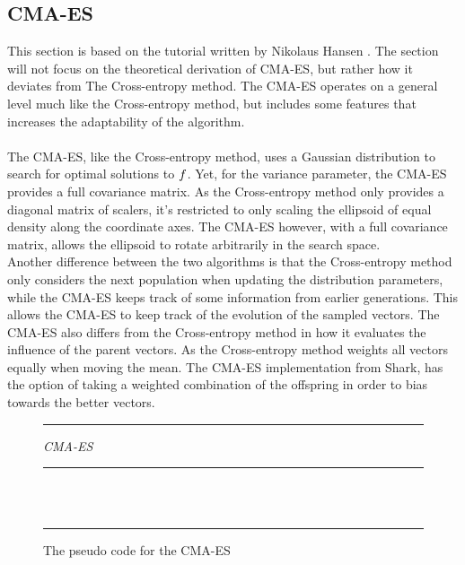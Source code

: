 \subsection{CMA-ES \label{CMAtheory}}

This section is based on the tutorial written by Nikolaus Hansen
\citep{hansen2011}. The section will not focus on the theoretical derivation
of CMA-ES, but rather how it deviates from The Cross-entropy method. 
The CMA-ES operates on a general level much like the Cross-entropy 
method, but includes some features that increases the adaptability 
of the algorithm.\\
\\
The CMA-ES, like the Cross-entropy method, uses a Gaussian distribution to
search for optimal solutions to $f$. Yet, for the 
variance parameter, the CMA-ES provides a full covariance matrix.
As the Cross-entropy method only provides a diagonal matrix of scalers,
it's restricted to only scaling the ellipsoid of equal density along
the coordinate axes. The CMA-ES however, with a full covariance matrix,
allows the ellipsoid to rotate arbitrarily in the search space.\\
Another difference between the two algorithms is that 
the Cross-entropy method only considers the next population when updating the
distribution parameters, while the CMA-ES keeps track of 
some information from earlier 
generations. This allows the CMA-ES to keep track of the evolution 
of the sampled vectors.
The CMA-ES also differs from the Cross-entropy method in how it evaluates the influence 
of the parent vectors. As the Cross-entropy method weights all vectors equally when 
moving the mean. The CMA-ES implementation from Shark, 
has the option of taking a weighted combination of the offspring in order
to bias towards the better vectors.

\begin{figure}[H]
\hrule
\vspace{0.2cm}
{\centering  \textit{CMA-ES}}
\vspace{0.2cm}
\hrule
\begin{algorithmic}
\\
\\
\Loop
{}
\EndLoop
\end{algorithmic}
\hrule
\caption{The pseudo code for the CMA-ES \label{fig:cmaCode}}
\end{figure}

